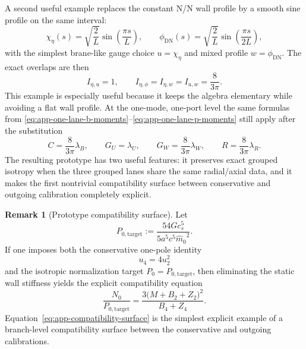 \documentclass[11pt]{article}
\theoremstyle{definition}
\newtheorem{remark}[theorem]{Remark}
\newcommand{\mhat}{\ensuremath{\hat m_0}}
\begin{document}
A second useful example replaces the constant N/N wall profile by a smooth sine profile on the same interval:
\begin{equation}
 \chi_\eta(s)=\sqrt{\frac{2}{L}}\sin\!\left(\frac{\pi s}{L}\right),
 \qquad
 \phi_{\mathrm{DN}}(s)=\sqrt{\frac{2}{L}}\sin\!\left(\frac{\pi s}{2L}\right),
 \label{eq:app-sine-profile-example}
\end{equation}
with the simplest brane-like gauge choice $u=\chi_\eta$ and mixed profile $w=\phi_{\mathrm{DN}}$. The exact overlaps are then
\begin{equation}
 I_{\eta,u}=1,
 \qquad
 I_{\eta,\phi}=I_{\eta,w}=I_{u,w}=\frac{8}{3\pi}.
 \label{eq:app-sine-profile-overlaps}
\end{equation}
This example is especially useful because it keeps the algebra elementary while avoiding a flat wall profile. At the one-mode, one-port level the same formulas from \eqref{eq:app-one-lane-b-moments}--\eqref{eq:app-one-lane-p-moments} still apply after the substitution
\begin{equation}
 C=\frac{8}{3\pi}\lambda_B,
 \qquad
 G_U=\lambda_U,
 \qquad
 G_W=\frac{8}{3\pi}\lambda_W,
 \qquad
 R=\frac{8}{3\pi}\lambda_R.
 \label{eq:app-sine-profile-amplitudes}
\end{equation}
The resulting prototype has two useful features: it preserves exact grouped isotropy when the three grouped lanes share the same radial/axial data, and it makes the first nontrivial compatibility surface between conservative and outgoing calibration completely explicit.

\begin{remark}[Prototype compatibility surface]
Let
\begin{equation}
 P_{0,\mathrm{target}}:=\frac{54Gc_s^5}{5a^5c^5\mhat^2}.
 \label{eq:app-p0-target}
\end{equation}
If one imposes both the conservative one-pole identity
\begin{equation}
 u_4 = 4u_2^2
 \label{eq:app-u4-one-pole-identity}
\end{equation}
and the isotropic normalization target $P_0=P_{0,\mathrm{target}}$, then eliminating the static wall stiffness yields the explicit compatibility equation
\begin{equation}
 \frac{N_0}{P_{0,\mathrm{target}}}
 =
 \frac{3\bigl(M+B_2+Z_2\bigr)^2}{B_4+Z_4}.
 \label{eq:app-compatibility-surface}
\end{equation}
Equation~\eqref{eq:app-compatibility-surface} is the simplest explicit example of a branch-level compatibility surface between the conservative and outgoing calibrations.
\end{remark}
\end{document}
